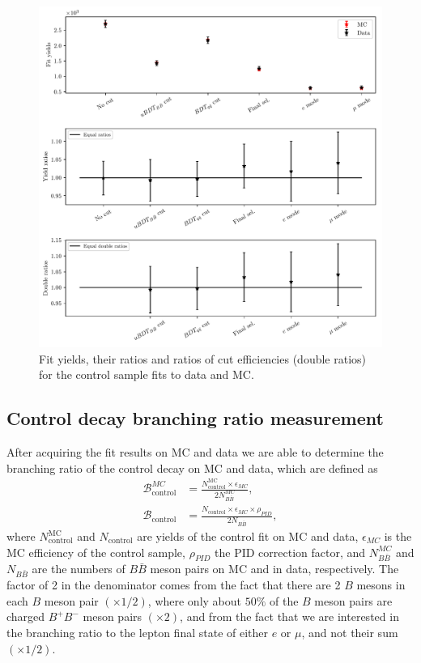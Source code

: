 \begin{figure}[H]
	\centering
	\captionsetup{width=0.8\linewidth}
	\includegraphics[width=\linewidth]{fig/cs_fits.pdf}
	\caption{Fit yields, their ratios and ratios of cut efficiencies (double ratios) for the control sample fits to data and MC.}
	\label{fig:cs_fits}
\end{figure}

\subsection{Control decay branching ratio measurement}

After acquiring the fit results on MC and data we are able to determine the branching ratio of the control decay on MC and data, which are defined as
\begin{align}
\mathcal{B}^{MC}_{\mathrm{control}} &= \frac{N^{\mathrm{MC}}_\mathrm{control} \times \epsilon_{MC}}{2N_{B\bar B}^{MC}},\\
\mathcal{B}_{\mathrm{control}} &= \frac{N_\mathrm{control} \times \epsilon_{MC} \times \rho_{PID}}{2N_{B\bar B}},
\label{eq:br_data}
\end{align}
where $N^{\mathrm{MC}}_\mathrm{control}$ and $N_\mathrm{control}$ are yields of the control fit on MC and data, $\epsilon_{MC}$ is the MC efficiency of the control sample, $\rho_{PID}$ the PID correction factor, and $N_{B\bar B}^{MC}$ and $N_{B\bar B}$ are the numbers of $B \bar B$ meson pairs on MC and in data, respectively. The factor of 2 in the denominator comes from the fact that there are 2 $B$ mesons in each $B$ meson pair $(\times 1/2)$, where only about $50\%$ of the $B$ meson pairs are charged $B^+B^-$ meson pairs $(\times 2)$, and from the fact that we are interested in the branching ratio to the lepton final state of either $e$ or $\mu$, and not their sum $(\times 1/2)$.

